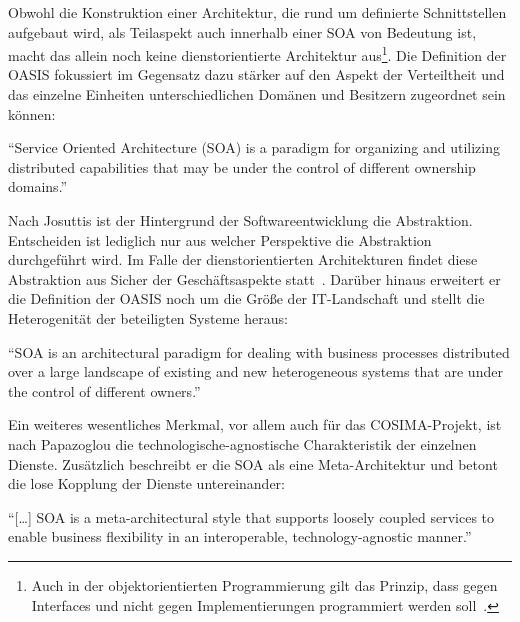   Obwohl die Konstruktion einer Architektur, die rund um definierte Schnittstellen aufgebaut wird, als Teilaspekt auch innerhalb einer SOA von Bedeutung ist, macht das allein noch keine dienstorientierte Architektur aus\footnote{Auch in der objektorientierten Programmierung gilt das Prinzip, dass gegen Interfaces und nicht gegen Implementierungen programmiert werden soll~\citep[S. 18]{design_patterns}.}. Die Definition der OASIS fokussiert im Gegensatz dazu stärker auf den Aspekt der Verteiltheit und das einzelne Einheiten unterschiedlichen Domänen und Besitzern zugeordnet sein können:

\begin{definition}\label{def:soa_oasis_reference_model_}
  "`Service Oriented Architecture (SOA) is a paradigm for organizing and utilizing distributed capabilities that may be under the control of different ownership domains."'~\emph{\citep[S. 8]{mackenzie2006rms}}
\end{definition}

  Nach Josuttis ist der Hintergrund der Softwareentwicklung die Abstraktion. Entscheiden ist lediglich nur aus welcher Perspektive die Abstraktion durchgeführt wird. Im Falle der dienstorientierten Architekturen findet diese Abstraktion aus Sicher der Geschäftsaspekte statt~\citep[S. 16]{soa_in_practice}. Darüber hinaus erweitert er die Definition der OASIS noch um die Größe der IT-Landschaft und stellt die Heterogenität der beteiligten Systeme heraus:

\begin{definition}\label{def:soa_josuttis_}
  "`SOA is an architectural paradigm for dealing with business processes distributed over a large landscape of existing and new heterogeneous systems that are under the control of different owners."'~\emph{\citep[S. 24]{soa_in_practice}}
\end{definition}

  Ein weiteres wesentliches Merkmal, vor allem auch für das COSIMA-Projekt, ist nach Papazoglou die technologische-agnostische Charakteristik der einzelnen Dienste. Zusätzlich beschreibt er die SOA als eine Meta-Architektur und betont die lose Kopplung der Dienste untereinander:

\begin{definition}\label{def:soa_papazoglou_}
  "`[\ldots] SOA is a meta-architectural style that supports loosely coupled services to enable business flexibility in an interoperable, technology-agnostic manner."'~\emph{\citep[S. 257]{web_services_principles_and_technology}}
\end{definition}

